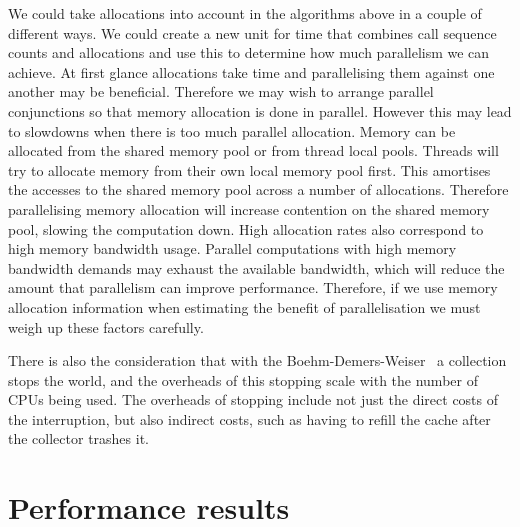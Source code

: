 We could take allocations into account in the algorithms above in a couple
of different ways.
We could create a new unit for time that combines call sequence counts
and allocations and use this to determine how much parallelism we can
achieve.
At first glance allocations take time and parallelising them against one
another may be beneficial.
Therefore we may wish to arrange parallel conjunctions so that memory
allocation is done in parallel.
However this may lead to slowdowns when there is too much parallel
allocation.
Memory can be allocated from the shared memory pool or from thread local
pools.
Threads will try to allocate memory from their own local memory pool first.
This amortises the accesses to the shared memory pool across a number of
allocations.
Therefore parallelising memory allocation will increase contention on the
shared memory pool, slowing the computation down.
High allocation rates also correspond to high memory bandwidth usage.
Parallel computations with high memory bandwidth demands may exhaust the
available bandwidth,
which will reduce the amount that parallelism can improve performance.
Therefore,
if we use memory allocation information when estimating the benefit of
parallelisation we must weigh up these factors carefully.

There is also the consideration that with the
Boehm-Demers-Weiser~\citep{boehm:1988:gc}
a collection stops the world,
and the overheads of this stopping scale with the number of CPUs being used.
The overheads of stopping include
not just the direct costs of the interruption,
but also indirect costs,
such as having to refill the cache after the collector trashes it.

\section{Performance results}
\label{sec:overlap_perf}


